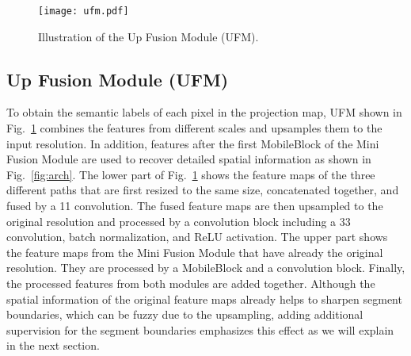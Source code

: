 \documentclass[letterpaper, 10 pt, journal, twoside]{ieeetran}
\newcommand{\figref}[1]{Fig.~\ref{#1}}
\begin{document}
\begin{figure}[!t]
    \centering
    \texttt{[image: ufm.pdf]}
    \caption{Illustration of the Up Fusion Module (UFM).}
    \label{fig:ufm}
    \vspace{-4mm}
\end{figure}

\begin{table}[!t]
    \centering
    \renewcommand{\tabcolsep}{3.5mm}
    \caption{Impact of the three modules.}
    \label{tab:ablation}
    \vspace{-3mm}
\end{table}


\subsection{Up Fusion Module (UFM)} \label{sec:ufm}
To obtain the semantic labels of each pixel in the projection map, UFM shown in \figref{fig:ufm} combines the features from different scales and upsamples them to the input resolution. In addition, features after the first MobileBlock of the Mini Fusion Module are used to recover detailed spatial information as shown in \figref{fig:arch}. The lower part of \figref{fig:ufm} shows the feature maps of the three different paths that are first resized to the same size, concatenated together, and fused by a 11 convolution. The fused feature maps are then upsampled to the original resolution and processed by a convolution block including a 33 convolution, batch normalization, and ReLU activation. The upper part shows the feature maps from the Mini Fusion Module that have already the original resolution. They are processed by a MobileBlock and a convolution block. Finally, the processed features from both modules are added together. Although the spatial information of the original feature maps already helps to sharpen segment boundaries, which can be fuzzy due to the upsampling, adding additional supervision for the segment boundaries emphasizes this effect as we will explain in the next section.
\end{document}
